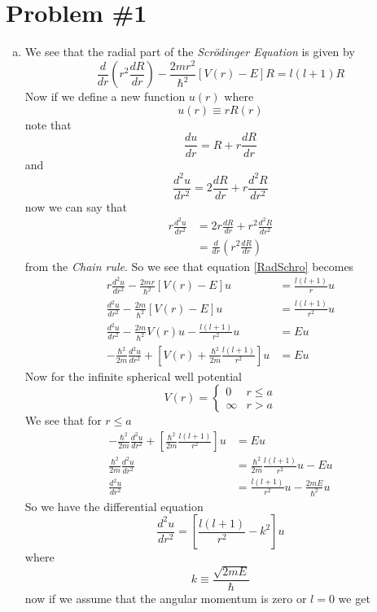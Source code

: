 \documentclass[11pt]{article}
\numberwithin{equation}{section}
\begin{document}


\section{Problem \#1}
\begin{enumerate}[(a)]
\item
We see that the radial part of the \emph{Scr\"{o}dinger Equation} is given by
\begin{equation}
\frac{d}{dr}\left(r^2\frac{dR}{dr}\right)-\frac{2mr^2}{\hbar^2}[V(r)-E]R = l(l+1)R
\label{RadSchro}
\end{equation}
Now if we define a new function $u(r)$ where
$$u(r)\equiv rR(r)$$
note that
$$\frac{du}{dr} = R+r\frac{dR}{dr}$$
and
$$\frac{d^2u}{dr^2} = 2\frac{dR}{dr}+r\frac{d^2R}{dr^2}$$
now we can say that
\begin{align*}
r\frac{d^2u}{dr^2} &= 2r\frac{dR}{dr}+r^2\frac{d^2R}{dr^2}\\
&= \frac{d}{dr}\left(r^2\frac{dR}{dr}\right)
\end{align*}
from the \emph{Chain rule}. So we see that equation \ref{RadSchro} becomes
\begin{align*}
r\frac{d^2u}{dr^2}-\frac{2mr}{\hbar^2}[V(r)-E]u &= \frac{l(l+1)}{r}u\\
\frac{d^2u}{dr^2}-\frac{2m}{\hbar^2}[V(r)-E]u &= \frac{l(l+1)}{r^2}u\\
\frac{d^2u}{dr^2}-\frac{2m}{\hbar^2}V(r)u - \frac{l(l+1)}{r^2}u &=Eu\\
-\frac{\hbar^2}{2m}\frac{d^2u}{dr^2}+\left[V(r) + \frac{\hbar^2}{2m}\frac{l(l+1)}{r^2}\right]u &=Eu
\end{align*}
Now for the infinite spherical well potential
$$V(r) = \left\{\begin{array}{lc}
0	&r\le a\\
\infty	&r> a
	\end{array}\right.$$
We see that for $r\le a$
\begin{align*}
-\frac{\hbar^2}{2m}\frac{d^2u}{dr^2}+\left[\frac{\hbar^2}{2m}\frac{l(l+1)}{r^2}\right]u &=Eu\\
\frac{\hbar^2}{2m}\frac{d^2u}{dr^2} &= \frac{\hbar^2}{2m}\frac{l(l+1)}{r^2}u - Eu\\
\frac{d^2u}{dr^2} &= \frac{l(l+1)}{r^2}u - \frac{2mE}{\hbar^2}u
\end{align*}
So we have the differential equation 
$$\frac{d^2u}{dr^2} = \left[\frac{l(l+1)}{r^2} - k^2\right]u$$
where
$$k\equiv\frac{\sqrt{2mE}}{\hbar}$$
now if we assume that the angular momentum is zero or $l=0$ we get

\end{enumerate}
\end{document}
